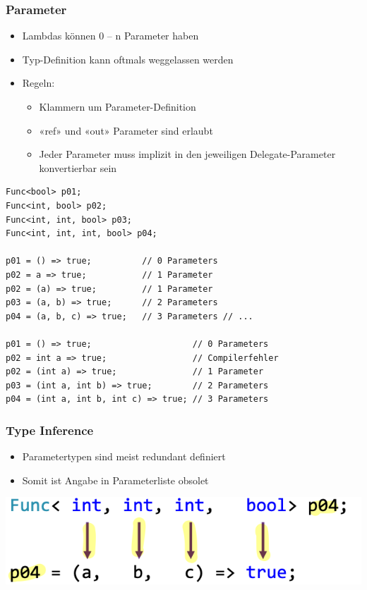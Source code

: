 \subsubsection{Parameter}
\begin{itemize}
    \item Lambdas können 0 – n Parameter haben
    \item Typ-Definition kann oftmals weggelassen werden
    \item Regeln:
    \begin{itemize}
        \item Klammern um Parameter-Definition
        \item «ref» und «out» Parameter sind erlaubt
        \item Jeder Parameter muss implizit in den jeweiligen Delegate-Parameter konvertierbar sein
    \end{itemize}
\end{itemize}
\begin{lstlisting}
Func<bool> p01;
Func<int, bool> p02;
Func<int, int, bool> p03;
Func<int, int, int, bool> p04;

p01 = () => true;          // 0 Parameters
p02 = a => true;           // 1 Parameter
p02 = (a) => true;         // 1 Parameter
p03 = (a, b) => true;      // 2 Parameters
p04 = (a, b, c) => true;   // 3 Parameters // ...

p01 = () => true;                    // 0 Parameters
p02 = int a => true;                 // Compilerfehler
p02 = (int a) => true;               // 1 Parameter
p03 = (int a, int b) => true;        // 2 Parameters
p04 = (int a, int b, int c) => true; // 3 Parameters
\end{lstlisting}

\subsubsection{Type Inference}
\begin{itemize}
    \item Parametertypen sind meist redundant definiert
    \item Somit ist Angabe in Parameterliste obsolet
\end{itemize}
\vspace{-8pt}
\begin{center}
    \includegraphics[scale=.33]{graphic/linq/Type Inference.png}
\end{center}
\vspace{-8pt}

